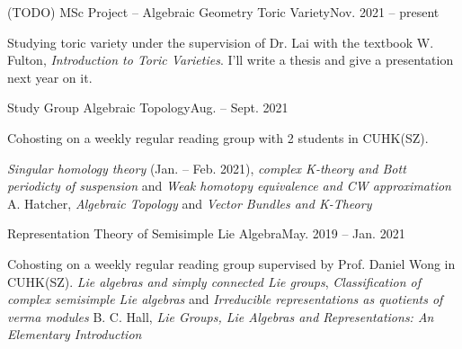 \resumeSubHeadingListStart
	\resumeSubheading
		{\color{red} (TODO) MSc Project -- Algebraic Geometry}{}
		{Toric Variety}{Nov. 2021 -- present}
		\resumeItemListStart
			\item{Studying toric variety under the supervision of Dr. Lai with the textbook W. Fulton, \textit{Introduction to Toric Varieties}. I'll write a thesis and give a presentation next year on it.}
		\resumeItemListEnd

	\resumeSubheading
		{Study Group}{}
		{Algebraic Topology}{Aug. -- Sept. 2021}
		\resumeItemListStart
			\item Cohosting on a weekly regular reading group with 2 students in CUHK(SZ). \par
				{\textit{Singular homology theory} (Jan. -- Feb. 2021), \textit{complex K-theory and Bott periodicty of suspension} and \textit{Weak homotopy equivalence and CW approximation}}
				{A. Hatcher, \textit{Algebraic Topology} and \textit{Vector Bundles and K-Theory}}
		\resumeItemListEnd
		
		\resumeSubSubheading
			{Representation Theory of Semisimple Lie Algebra}{May. 2019 -- Jan. 2021}
			\resumeItemListStart
				\item Cohosting on a weekly regular reading group supervised by Prof. Daniel Wong in CUHK(SZ).
					{\textit{Lie algebras and simply connected Lie groups}, \textit{Classification of complex semisimple Lie algebras} and \textit{Irreducible representations as quotients of verma modules}}
				{B. C. Hall, \textit{Lie Groups, Lie Algebras and Representations: An Elementary Introduction}}
			\resumeItemListEnd
		
\resumeSubHeadingListEnd

